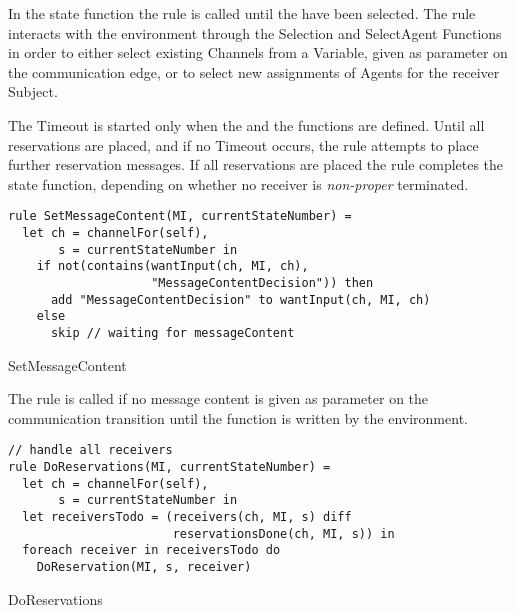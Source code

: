 In the state function the  rule is called until
the  have been selected. The  rule
interacts with the environment through the Selection and SelectAgent Functions
in order to either select existing Channels from a Variable, given as parameter
on the communication edge, or to select new assignments of Agents for the receiver
Subject.

The Timeout is started only when the  and the
 functions are defined. Until all reservations are
placed, and if no Timeout occurs, the  rule attempts
to place further reservation messages. If all reservations are placed the
 rule completes the state function, depending
on whether no receiver is \textit{non-proper} terminated.


\begin{listing}[H]
\begin{verbatim}
rule SetMessageContent(MI, currentStateNumber) =
  let ch = channelFor(self),
       s = currentStateNumber in
    if not(contains(wantInput(ch, MI, ch),
                    "MessageContentDecision")) then
      add "MessageContentDecision" to wantInput(ch, MI, ch)
    else
      skip // waiting for messageContent
\end{verbatim}
\caption{SetMessageContent}
\label{lst:shortasm:SetMessageContent}
\end{listing}



The  rule is called if no message content is
given as parameter on the communication transition until the 
function is written by the environment.





\begin{listing}[H]
\begin{verbatim}
// handle all receivers
rule DoReservations(MI, currentStateNumber) =
  let ch = channelFor(self),
       s = currentStateNumber in
  let receiversTodo = (receivers(ch, MI, s) diff
                       reservationsDone(ch, MI, s)) in
  foreach receiver in receiversTodo do
    DoReservation(MI, s, receiver)
\end{verbatim}
\caption{DoReservations}
\label{lst:shortasm:DoReservations}
\end{listing}



